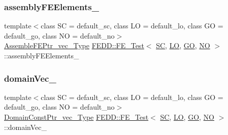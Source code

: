 \subsubsection{\texorpdfstring{assembly\+F\+E\+Elements\+\_\+}{assemblyFEElements\_}}
{\footnotesize\ttfamily template$<$class SC  = default\+\_\+sc, class LO  = default\+\_\+lo, class GO  = default\+\_\+go, class NO  = default\+\_\+no$>$ \\
\hyperlink{classFEDD_1_1FE__Test_a7c6207bb2e578ea92dbfb20aa766e2d3}{Assemble\+F\+E\+Ptr\+\_\+vec\+\_\+\+Type} \hyperlink{classFEDD_1_1FE__Test}{F\+E\+D\+D\+::\+F\+E\+\_\+\+Test}$<$ \hyperlink{fe__test__laplace_8cpp_a79c7e86a57edbb2a5a53242bcd04e41e}{SC}, \hyperlink{fe__test__laplace_8cpp_ad6a38c9f07d3fd633eefca5bccad8410}{LO}, \hyperlink{fe__test__laplace_8cpp_afa2946b509009b4f45eb04bd8c5b27d9}{GO}, \hyperlink{fe__test__laplace_8cpp_a5e24f37b28787429872b6ecb1d0417ce}{NO} $>$\+::assembly\+F\+E\+Elements\+\_\+\hspace{0.3cm}{\ttfamily [private]}}

\mbox{\label{classFEDD_1_1FE__Test_ad429d8e769350d7ab954942729d77674}} 
\subsubsection{\texorpdfstring{domain\+Vec\+\_\+}{domainVec\_}}
{\footnotesize\ttfamily template$<$class SC  = default\+\_\+sc, class LO  = default\+\_\+lo, class GO  = default\+\_\+go, class NO  = default\+\_\+no$>$ \\
\hyperlink{classFEDD_1_1FE__Test_a3345ab320c9e19d77dc7fec9645da0d0}{Domain\+Const\+Ptr\+\_\+vec\+\_\+\+Type} \hyperlink{classFEDD_1_1FE__Test}{F\+E\+D\+D\+::\+F\+E\+\_\+\+Test}$<$ \hyperlink{fe__test__laplace_8cpp_a79c7e86a57edbb2a5a53242bcd04e41e}{SC}, \hyperlink{fe__test__laplace_8cpp_ad6a38c9f07d3fd633eefca5bccad8410}{LO}, \hyperlink{fe__test__laplace_8cpp_afa2946b509009b4f45eb04bd8c5b27d9}{GO}, \hyperlink{fe__test__laplace_8cpp_a5e24f37b28787429872b6ecb1d0417ce}{NO} $>$\+::domain\+Vec\+\_\+}

\mbox{\label{classFEDD_1_1FE__Test_a9d4fe8878ab5ce8bf7817b2b7f57b1fc}} 
